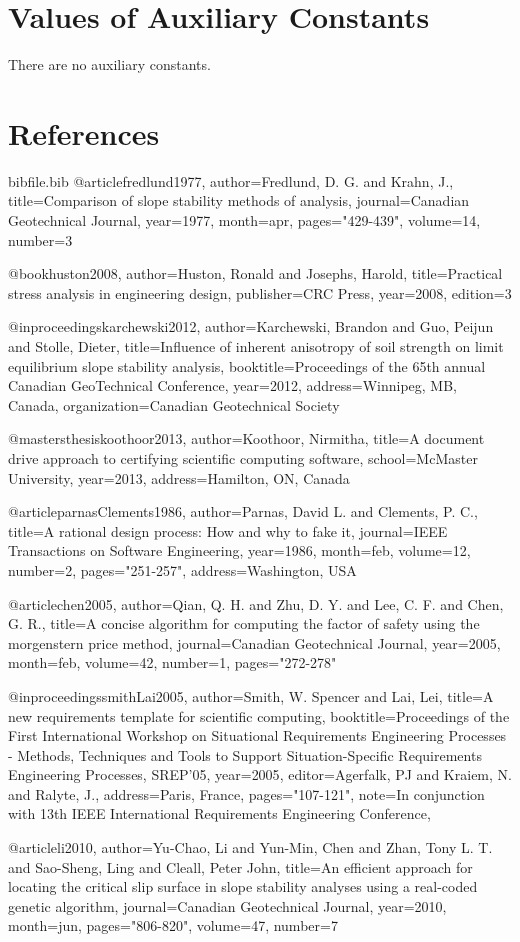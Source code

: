 \documentclass[12pt]{article}
\begin{document}
\section{Values of Auxiliary Constants}
\label{Sec:AuxConstants}
There are no auxiliary constants.
\section{References}
\label{Sec:References}
\begin{filecontents*}{bibfile.bib}
@article{fredlund1977,
author={Fredlund, D. G. and Krahn, J.},
title={Comparison of slope stability methods of analysis},
journal={Canadian Geotechnical Journal},
year={1977},
month=apr,
pages={"429-439"},
volume={14},
number={3}}

@book{huston2008,
author={Huston, Ronald and Josephs, Harold},
title={Practical stress analysis in engineering design},
publisher={CRC Press},
year={2008},
edition={3}}

@inproceedings{karchewski2012,
author={Karchewski, Brandon and Guo, Peijun and Stolle, Dieter},
title={Influence of inherent anisotropy of soil strength on limit equilibrium slope stability analysis},
booktitle={Proceedings of the 65th annual Canadian GeoTechnical Conference},
year={2012},
address={Winnipeg, MB, Canada},
organization={Canadian Geotechnical Society}}

@mastersthesis{koothoor2013,
author={Koothoor, Nirmitha},
title={A document drive approach to certifying scientific computing software},
school={McMaster University},
year={2013},
address={Hamilton, ON, Canada}}

@article{parnasClements1986,
author={Parnas, David L. and Clements, P. C.},
title={A rational design process: How and why to fake it},
journal={IEEE Transactions on Software Engineering},
year={1986},
month=feb,
volume={12},
number={2},
pages={"251-257"},
address={Washington, USA}}

@article{chen2005,
author={Qian, Q. H. and Zhu, D. Y. and Lee, C. F. and Chen, G. R.},
title={A concise algorithm for computing the factor of safety using the morgenstern price method},
journal={Canadian Geotechnical Journal},
year={2005},
month=feb,
volume={42},
number={1},
pages={"272-278"}}

@inproceedings{smithLai2005,
author={Smith, W. Spencer and Lai, Lei},
title={A new requirements template for scientific computing},
booktitle={Proceedings of the First International Workshop on Situational Requirements Engineering Processes - Methods, Techniques and Tools to Support Situation-Specific Requirements Engineering Processes, SREP'05},
year={2005},
editor={Agerfalk, PJ and Kraiem, N. and Ralyte, J.},
address={Paris, France},
pages={"107-121"},
note={In conjunction with 13th IEEE International Requirements Engineering Conference,}}

@article{li2010,
author={Yu-Chao, Li and Yun-Min, Chen and Zhan, Tony L. T. and Sao-Sheng, Ling and Cleall, Peter John},
title={An efficient approach for locating the critical slip surface in slope stability analyses using a real-coded genetic algorithm},
journal={Canadian Geotechnical Journal},
year={2010},
month=jun,
pages={"806-820"},
volume={47},
number={7}}
\end{filecontents*}
\nocite{*}
\printbibliography[heading=none]
\end{document}
